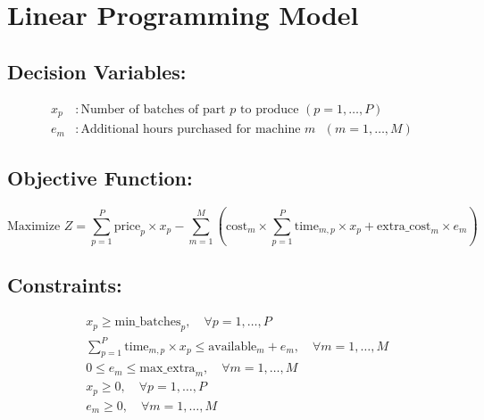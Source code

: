 \documentclass{article}
\begin{document}
\section*{Linear Programming Model}

\subsection*{Decision Variables:}
\begin{align*}
x_p & : \text{Number of batches of part } p \text{ to produce } (p = 1, \ldots, P) \\
e_m & : \text{Additional hours purchased for machine } m \text{ } (m = 1, \ldots, M)
\end{align*}

\subsection*{Objective Function:}
\begin{equation*}
\text{Maximize } Z = \sum_{p=1}^{P} \text{price}_{p} \times x_p - \sum_{m=1}^{M} \left(\text{cost}_{m} \times \sum_{p=1}^{P} \text{time}_{m,p} \times x_p + \text{extra_cost}_{m} \times e_m\right)
\end{equation*}

\subsection*{Constraints:}
\begin{align*}
& x_p \geq \text{min\_batches}_{p}, \quad \forall p = 1, \ldots, P \\
& \sum_{p=1}^{P} \text{time}_{m,p} \times x_p \leq \text{available}_{m} + e_m, \quad \forall m = 1, \ldots, M \\
& 0 \leq e_m \leq \text{max\_extra}_{m}, \quad \forall m = 1, \ldots, M \\
& x_p \geq 0, \quad \forall p = 1, \ldots, P \\
& e_m \geq 0, \quad \forall m = 1, \ldots, M
\end{align*}
\end{document}
